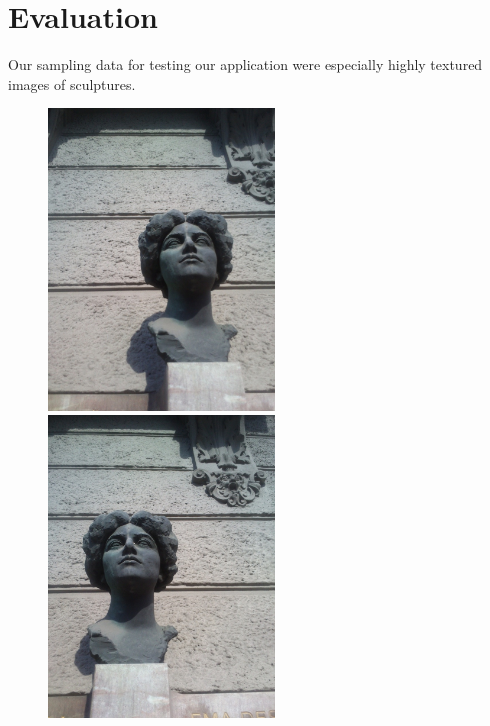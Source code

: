 \chapter{Evaluation}
\label{chap:eval}

Our sampling data for testing our application were especially highly textured images of sculptures.


\begin{figure}[h]
\centerline{
\includegraphics[width=6.0cm]{img/ema_a.png}
\includegraphics[width=6.0cm]{img/ema_b.png}}


\end{figure}
